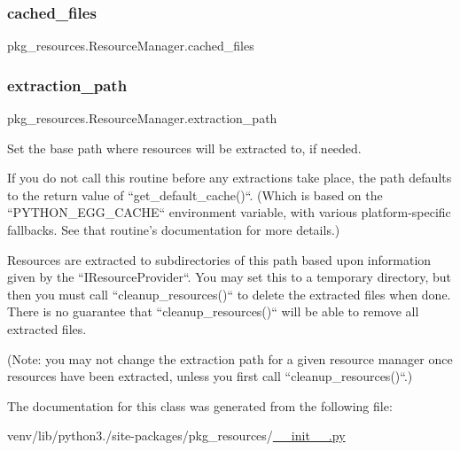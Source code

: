 \subsubsection{\texorpdfstring{cached\+\_\+files}{cached\_files}}
{\footnotesize\ttfamily pkg\+\_\+resources.\+Resource\+Manager.\+cached\+\_\+files}

\mbox{\label{classpkg__resources_1_1ResourceManager_a6120904625d6624b7ecae0f9175ea9dd}} 
\subsubsection{\texorpdfstring{extraction\+\_\+path}{extraction\_path}}
{\footnotesize\ttfamily pkg\+\_\+resources.\+Resource\+Manager.\+extraction\+\_\+path\hspace{0.3cm}{\ttfamily [static]}}

\begin{DoxyVerb}Set the base path where resources will be extracted to, if needed.

If you do not call this routine before any extractions take place, the
path defaults to the return value of ``get_default_cache()``.  (Which
is based on the ``PYTHON_EGG_CACHE`` environment variable, with various
platform-specific fallbacks.  See that routine's documentation for more
details.)

Resources are extracted to subdirectories of this path based upon
information given by the ``IResourceProvider``.  You may set this to a
temporary directory, but then you must call ``cleanup_resources()`` to
delete the extracted files when done.  There is no guarantee that
``cleanup_resources()`` will be able to remove all extracted files.

(Note: you may not change the extraction path for a given resource
manager once resources have been extracted, unless you first call
``cleanup_resources()``.)
\end{DoxyVerb}
 

The documentation for this class was generated from the following file\+:\begin{DoxyCompactItemize}
\item 
venv/lib/python3./site-\/packages/pkg\+\_\+resources/\hyperlink{venv_2lib_2python3_89_2site-packages_2pkg__resources_2____init_____8py}{\+\_\+\+\_\+init\+\_\+\+\_\+.\+py}\end{DoxyCompactItemize}

